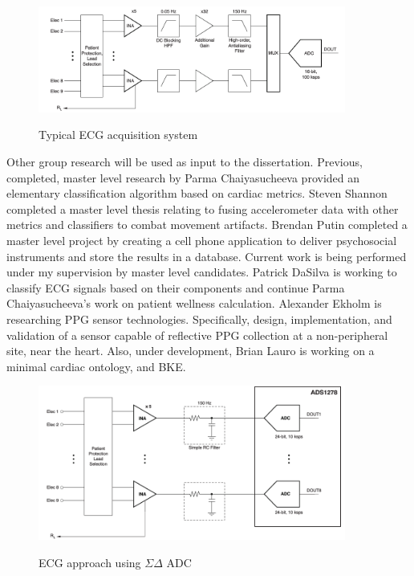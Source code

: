 \begin{figure}
	\begin{center}
		\label{fig:SAR_topology}
		\includegraphics[scale=1,width=0.9\textwidth]{Images/SAR_topology.png} 
		\caption{Typical ECG acquisition system }
	\end{center}
\end{figure}

Other group research will be used as input to the dissertation. Previous, completed, master level research by Parma Chaiyasucheeva provided an elementary classification algorithm based on cardiac metrics. Steven Shannon completed a master level thesis relating to fusing accelerometer data with other metrics and classifiers to combat movement artifacts. Brendan Putin completed a master level project by creating a cell phone application to deliver psychosocial instruments and store the results in a database. Current work is being performed under my supervision by master level candidates. Patrick DaSilva is working to classify ECG signals based on their components and continue Parma Chaiyasucheeva's work on patient wellness calculation. Alexander Ekholm is researching PPG sensor technologies. Specifically, design, implementation, and validation of a sensor capable of reflective PPG collection at a non-peripheral site, near the heart.  Also, under development, Brian Lauro is working on a minimal cardiac ontology, and BKE.

\begin{figure}
	\begin{center}
		\label{fig:sigmaDelta_topology}
		\includegraphics[scale=1,width=0.9\textwidth]{Images/sigmaDelta_topology_simultanious.png} 
		\caption{ECG approach using $\Sigma\Delta $ ADC}
	\end{center}
\end{figure}

